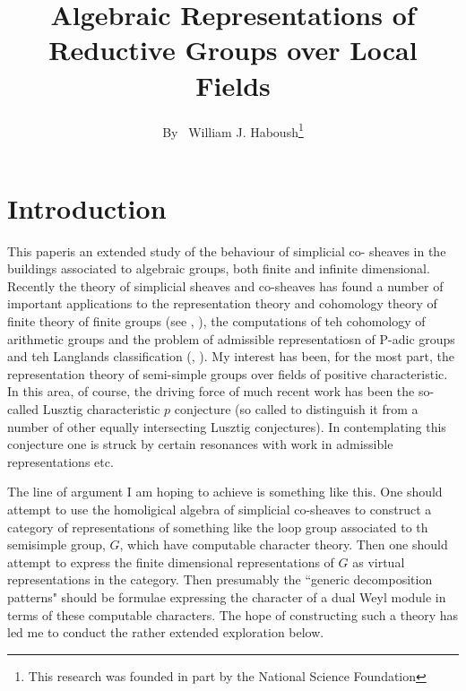 \title{Algebraic Representations of Reductive Groups over Local Fields}

\author{By~ William J. Haboush\footnote{This research was founded in part by the National Science Foundation}}

\date{}
\maketitle



\section*{Introduction}

This paper\pageoriginale is an extended study of the behaviour of simplicial co- sheaves in the buildings associated to algebraic groups, both finite and infinite dimensional. Recently the theory of simplicial sheaves and co-sheaves has found a number of important applications to the representation theory and cohomology theory of finite theory of finite groups (see \cite{art6-keyT}, \cite{art6-keyRS}), the computations of teh cohomology of arithmetic groups and the problem of admissible representatiosn of P-adic groups and teh Langlands classification (\cite{art6-keyCW}, \cite{art6-keyBW}). My interest has been, for the most part, the representation theory of semi-simple groups over fields of positive characteristic. In this area, of course, the driving force of much recent work has been the so-called Lusztig characteristic $p$ conjecture \cite{art6-keyL1} (so called to distinguish it from a number of other equally intersecting Lusztig conjectures). In contemplating this conjecture one is struck by certain resonances with work in admissible representations etc.

The line of argument I am hoping to achieve is something like this. One should attempt to use the homoligical algebra of simplicial co-sheaves to construct a category of representations of something like the loop group associated to th semisimple group, $G$, which have computable character theory. Then one should attempt to express the finite dimensional representations of $G$ as virtual representations in the category. Then presumably the ``generic decomposition patterns" should be formulae expressing the character of a dual Weyl module in terms of these computable characters. The hope of constructing such a theory has led me to conduct the rather extended exploration below.  

